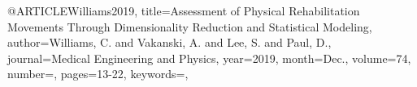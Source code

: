@ARTICLE{Williams2019,
title={Assessment of Physical Rehabilitation Movements Through Dimensionality Reduction and Statistical Modeling},
author={Williams, C. and Vakanski, A. and Lee, S. and Paul, D.},
journal={Medical Engineering and Physics}, 
year={2019},
month={Dec.},
volume={74},
number={},
pages={13-22},
keywords={},
}
